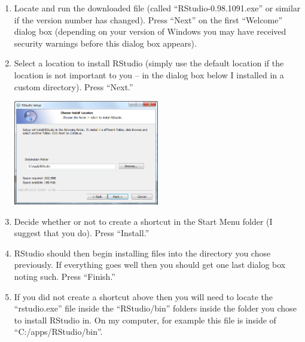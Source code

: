 \documentclass{article}\usepackage[]{graphicx}\usepackage[]{color}
\begin{document}
\begin{enumerate}
  \item Locate and run the downloaded file (called ``RStudio-0.98.1091.exe'' or similar if the version number has changed).  Press ``Next'' on the first ``Welcome'' dialog box (depending on your version of Windows you may have received security warnings before this dialog box appears).

  \item Select a location to install RStudio (simply use the default location if the location is not important to you -- in the dialog box below I installed in a custom directory).  Press ``Next.''
\begin{center}
  \includegraphics[width=2.5in]{Figs/RStudio_Install_Directory.png}
\end{center}

  \item Decide whether or not to create a shortcut in the Start Menu folder (I suggest that you do).  Press ``Install.''

  \item RStudio should then begin installing files into the directory you chose previously.  If everything goes well then you should get one last dialog box noting such.  Press ``Finish.''

  \item If you did not create a shortcut above then you will need to locate the ``rstudio.exe'' file inside the ``RStudio/bin'' folders inside the folder you chose to install RStudio in.  On my computer, for example this file is inside of ``C:/apps/RStudio/bin''.
\end{enumerate}
\end{document}
